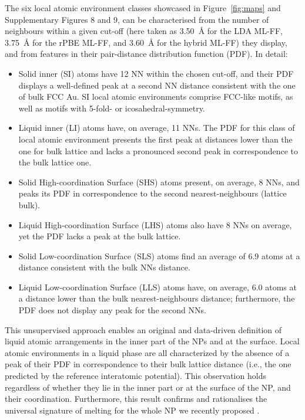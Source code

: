 \documentclass[%
aip,
 amsmath,amssymb,
 reprint,
]{revtex4-1}
\begin{document}
The six local atomic environment classes showcased in Figure~\ref{fig:maps} and Supplementary Figures 8 and 9, can be characterised from the number of  neighbours within a given cut-off (here taken as 3.50~$\text{\AA}$ for the LDA ML-FF, 3.75~$\text{\AA}$ for the rPBE ML-FF, and 3.60~$\text{\AA}$ for the hybrid ML-FF) they display, and from features in their pair-distance distribution function (PDF).
%
In detail:
%
\begin{itemize}
    \item Solid inner (SI) atoms have 12 NN within the chosen cut-off, and their PDF displays a well-defined peak at a second NN distance consistent with the one of bulk FCC Au. 
    SI local atomic environments comprise FCC-like motifs, as well as motifs with 5-fold- or icosahedral-symmetry.
    \item Liquid inner (LI) atoms have, on average, 11 NNs.
    The PDF for this class of local atomic environment presents the first peak at distances lower than the one for bulk lattice and lacks a pronounced second peak in correspondence to the bulk lattice one.
    \item Solid High-coordination Surface (SHS) atoms present, on average, 8 NNs, and peaks its PDF in correspondence to the second nearest-neighbours (lattice bulk).
    \item Liquid High-coordination Surface (LHS) atoms also have 8 NNs on average, yet the PDF lacks a peak at the bulk lattice.
    \item Solid Low-coordination Surface (SLS) atoms find an average of 6.9 atoms at a distance consistent with the bulk NNs distance.
    \item Liquid Low-coordination Surface (LLS) atoms have, on average, 6.0 atoms at a distance lower than the bulk nearest-neighbours distance; furthermore, the PDF does not display any peak for the second NNs.
\end{itemize}

This unsupervised approach enables an original and data-driven definition of liquid atomic arrangements in the inner part of the NPs and at the surface. 
%
Local atomic environments in a liquid phase are all characterized by the absence of a peak of their PDF in correspondence to their bulk lattice distance (i.e., the one predicted by the reference interatomic potential).
%
This observation holds regardless of whether they lie in the inner part or at the surface of the NP, and their coordination.
%
Furthermore, this result confirms and rationalises the universal signature of melting for the whole NP we recently proposed \cite{Delgado-Callico2020}.
%
\end{document}
